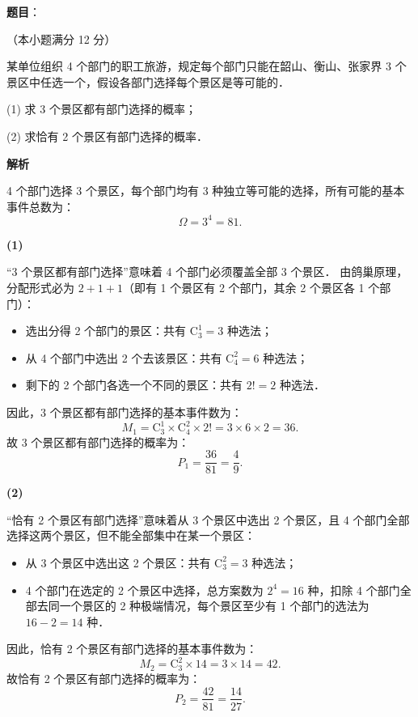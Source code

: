 \begin{answer}

\textbf{题目}：

（本小题满分 12 分）

某单位组织 4 个部门的职工旅游，规定每个部门只能在韶山、衡山、张家界 3 个景区中任选一个，假设各部门选择每个景区是等可能的．

(1) 求 3 个景区都有部门选择的概率；

(2) 求恰有 2 个景区有部门选择的概率．

\textbf{解析}

4 个部门选择 3 个景区，每个部门均有 3 种独立等可能的选择，所有可能的基本事件总数为：
\nopagebreak[4]
\[
\Omega = 3^4 = 81.
\]

\textbf{(1)}

“3 个景区都有部门选择”意味着 4 个部门必须覆盖全部 3 个景区．
由鸽巢原理，分配形式必为 $2 + 1 + 1$（即有 1 个景区有 2 个部门，其余 2 个景区各 1 个部门）：
\begin{itemize}
\item 选出分得 2 个部门的景区：共有 $\mathrm{C}_3^1 = 3$ 种选法；
\item 从 4 个部门中选出 2 个去该景区：共有 $\mathrm{C}_4^2 = 6$ 种选法；
\item 剩下的 2 个部门各选一个不同的景区：共有 $2! = 2$ 种选法．
\end{itemize}

因此，3 个景区都有部门选择的基本事件数为：
\nopagebreak[4]
\[
M_1 = \mathrm{C}_3^1 \times \mathrm{C}_4^2 \times 2! = 3 \times 6 \times 2 = 36.
\]
故 3 个景区都有部门选择的概率为：
\nopagebreak[4]
\[
P_1 = \frac{36}{81} = \frac{4}{9}.
\]

\textbf{(2)}

“恰有 2 个景区有部门选择”意味着从 3 个景区中选出 2 个景区，且 4 个部门全部选择这两个景区，但不能全部集中在某一个景区：
\begin{itemize}
\item 从 3 个景区中选出这 2 个景区：共有 $\mathrm{C}_3^2 = 3$ 种选法；
\item 4 个部门在选定的 2 个景区中选择，总方案数为 $2^4 = 16$ 种，扣除 4 个部门全部去同一个景区的 2 种极端情况，每个景区至少有 1 个部门的选法为 $16 - 2 = 14$ 种．
\end{itemize}

因此，恰有 2 个景区有部门选择的基本事件数为：
\nopagebreak[4]
\[
M_2 = \mathrm{C}_3^2 \times 14 = 3 \times 14 = 42.
\]
故恰有 2 个景区有部门选择的概率为：
\nopagebreak[4]
\[
P_2 = \frac{42}{81} = \frac{14}{27}.
\]



\end{answer}
